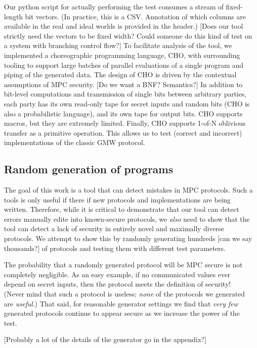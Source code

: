 \documentclass[conference]{IEEEtran}
\begin{document}
Our python script for actually performing the test consumes a stream of fixed-length bit vectors.
(In practice, this is a CSV. Annotation of which columns are available in the real and ideal worlds is provided in the header.)
[Does our tool strictly need the vectors to be fixed width? Could someone do this kind of test on a system with branching control flow?]
To facilitate analysis of the tool, we implemented a choreographic programming language, CHO,
with surrounding tooling to support large batches of parallel evaluations of a single program and piping of the generated data.
The design of CHO is driven by the contextual assumptions of MPC security.
[Do we want a BNF? Semantics?]
In addition to bit-level computations and transmission of single bits between arbitrary parties,
each party has its own read-only tape for secret inputs and random bits
(CHO is also a probabilistic language),
and its own tape for output bits.
CHO supports macros, but they are extremely limited.
Finally, CHO supports 1-of-N oblivious transfer as a primitive operation.
This allows us to test (correct and incorrect) implementations of the classic GMW protocol.

\subsection{Random generation of programs}

The goal of this work is a tool that can detect mistakes in MPC protocols.
Such a tools is only useful if there if new protocols and implementations are being written.
Therefore, while it is critical to demonstrate that our tool can detect errors manually edite into known-secure protocols,
we \textit{also} need to show that the tool can detect a lack of security in entirely novel and maximally diverse protocols.
We attempt to show this by randomly generating hundreds [can we say thousands?] of protocols and testing them with different test parameters.

The probability that a randomly generated protocol will be MPC secure is not completely negligible.
As an easy example, if no communicated values ever depend on secret inputs, then the protocol meets the definition of security!
(Never mind that such a protocol is useless; \textit{none} of the protocols we generated are \textit{useful}.)
That said, for reasonable generator settings we find that \textit{very few} generated protocols
continue to appear secure as we increase the power of the test.

[Probably a lot of the details of the generator go in the appendix?]
\end{document}
